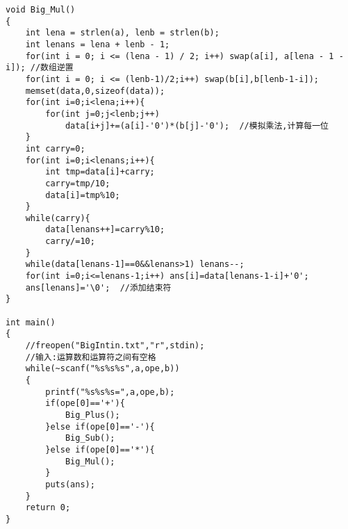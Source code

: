 \begin{lstlisting}
void Big_Mul()
{
    int lena = strlen(a), lenb = strlen(b);
    int lenans = lena + lenb - 1;
    for(int i = 0; i <= (lena - 1) / 2; i++) swap(a[i], a[lena - 1 - i]); //数组逆置
    for(int i = 0; i <= (lenb-1)/2;i++) swap(b[i],b[lenb-1-i]);
    memset(data,0,sizeof(data));
    for(int i=0;i<lena;i++){
        for(int j=0;j<lenb;j++)
            data[i+j]+=(a[i]-'0')*(b[j]-'0');  //模拟乘法,计算每一位
    }
    int carry=0;
    for(int i=0;i<lenans;i++){
        int tmp=data[i]+carry;
        carry=tmp/10;
        data[i]=tmp%10;
    }
    while(carry){
        data[lenans++]=carry%10;
        carry/=10;
    }
    while(data[lenans-1]==0&&lenans>1) lenans--;
    for(int i=0;i<=lenans-1;i++) ans[i]=data[lenans-1-i]+'0';
    ans[lenans]='\0';  //添加结束符
}

int main()
{
    //freopen("BigIntin.txt","r",stdin);
    //输入:运算数和运算符之间有空格
    while(~scanf("%s%s%s",a,ope,b))
    {
        printf("%s%s%s=",a,ope,b);
        if(ope[0]=='+'){
            Big_Plus();
        }else if(ope[0]=='-'){
            Big_Sub();
        }else if(ope[0]=='*'){
            Big_Mul();
        }
        puts(ans);
    }
    return 0;
}
\end{lstlisting}

